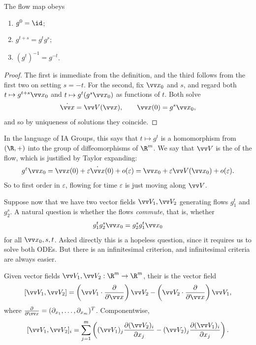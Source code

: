 \begin{proposition}
	The flow map obeys
	\begin{enumerate}[label=(\roman*)]
		\item $g^0 = \id$;
		\item $g^{t+s} = g^t g^s$;
		\item $(g^t)^{-1} = g^{-t}$.
	\end{enumerate}
\end{proposition}
\begin{proof}
	The first is immediate from the definition, and the third follows from the first two on setting $s = -t$. For the second, fix $\vv x_0$ and $s$, and regard both $t \mapsto g^{t+s}\vv x_0$ and $t \mapsto g^t(g^s \vv x_0)$ as functions of $t$. Both solve
	$$
	\dot{\vv x} = \vv V(\vv x), \qquad \vv x(0) = g^s \vv x_0,
	$$
	and so by uniqueness of solutions they coincide.
\end{proof}

In the language of IA Groups, this says that $t \mapsto g^t$ is a homomorphism from $(\R, +)$ into the group of diffeomorphisms of $\R^m$. We say that $\vv V$ is the  of the flow, which is justified by Taylor expanding:
$$
g^\varepsilon \vv x_0 = \vv x(0) + \varepsilon \dot{\vv x}(0) + o(\varepsilon) = \vv x_0 + \varepsilon \vv V(\vv x_0) + o(\varepsilon).
$$
So to first order in $\varepsilon$, flowing for time $\varepsilon$ is just moving along $\vv V$.

Suppose now that we have two vector fields $\vv V_1, \vv V_2$ generating flows $g_1^t$ and $g_2^s$. A natural question is whether the flows \emph{commute}, that is, whether
$$
g_1^t g_2^s \vv x_0 = g_2^s g_1^t \vv x_0
$$
for all $\vv x_0, s, t$. Asked directly this is a hopeless question, since it requires us to solve both ODEs. But there is an infinitesimal criterion, and infinitesimal criteria are always easier.

\begin{definition}[Commutator]
	Given vector fields $\vv V_1, \vv V_2 : \R^m \to \R^m$, their  is the vector field
	$$
	[\vv V_1, \vv V_2] = \left(\vv V_1 \cdot \frac{\partial}{\partial \vv x}\right) \vv V_2 - \left(\vv V_2 \cdot \frac{\partial}{\partial \vv x}\right)\vv V_1,
	$$
	where $\frac{\partial}{\partial \vv x} = (\partial_{x_1}, \dots, \partial_{x_m})^T$. Componentwise,
	$$
	[\vv V_1, \vv V_2]_i = \sum_{j=1}^m \left((\vv V_1)_j \frac{\partial (\vv V_2)_i}{\partial x_j} - (\vv V_2)_j \frac{\partial (\vv V_1)_i}{\partial x_j}\right).
	$$
\end{definition}

